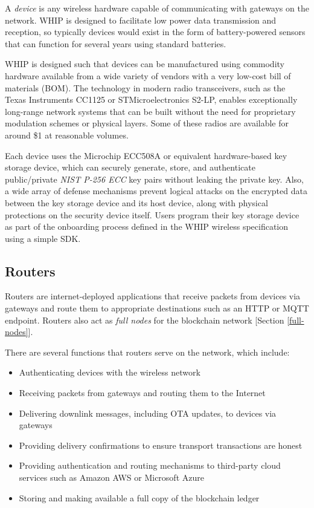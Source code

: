 \documentclass[10pt, nonatbib, nocopyrightspace, reprint]{sigplanconf}
\begin{document}
A \emph{device} is any wireless hardware capable of communicating with gateways on the network. WHIP is designed to facilitate low power data transmission and reception, so typically devices would exist in the form of battery-powered sensors that can function for several years using standard batteries.

WHIP is designed such that devices can be manufactured using commodity hardware available from a wide variety of vendors with a very low-cost bill of materials (BOM). The technology in modern radio transceivers, such as the Texas Instruments CC1125 or STMicroelectronics S2-LP, enables exceptionally long-range network systems that can be built without the need for proprietary modulation schemes or physical layers. Some of these radios are available for around \$1 at reasonable volumes.

Each device uses the Microchip ECC508A or equivalent hardware-based key storage device, which can securely generate, store, and authenticate public/private \emph{NIST P-256 ECC} \cite{nist} key pairs without leaking the private key. Also, a wide array of defense mechanisms prevent logical attacks on the encrypted data between the key storage device and its host device, along with physical protections on the security device itself. Users program their key storage device as part of the onboarding process defined in the WHIP wireless specification using a simple SDK\@.

\subsection{Routers}

Routers are internet-deployed applications that receive packets from devices via gateways and route them to appropriate destinations such as an HTTP or MQTT endpoint. Routers also act as \emph{full nodes} for the blockchain network [Section \ref{full-nodes}].

There are several functions that routers serve on the network, which include:

\begin{itemize}
    \item Authenticating devices with the wireless network
    \item Receiving packets from gateways and routing them to the Internet
    \item Delivering downlink messages, including OTA updates, to devices via gateways
    \item Providing delivery confirmations to ensure transport transactions are honest
    \item Providing authentication and routing mechanisms to third-party cloud services such as Amazon AWS or Microsoft Azure
    \item Storing and making available a full copy of the blockchain ledger
\end{itemize}
\end{document}
